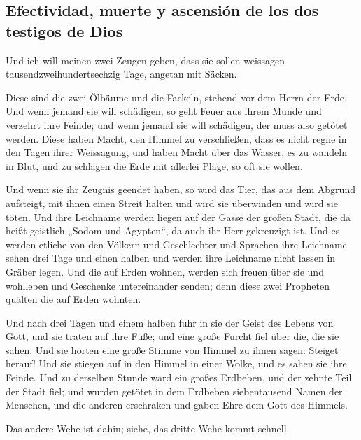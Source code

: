 \hypertarget{efectividad-muerte-y-ascensiuxf3n-de-los-dos-testigos-de-dios}{%
\subsection{Efectividad, muerte y ascensión de los dos testigos de
Dios}\label{efectividad-muerte-y-ascensiuxf3n-de-los-dos-testigos-de-dios}}

 Und ich will meinen zwei Zeugen geben, dass sie sollen
weissagen tausendzweihundertsechzig Tage, angetan mit Säcken.

 Diese sind die zwei Ölbäume und die Fackeln, stehend vor
dem Herrn der Erde.  Und wenn jemand sie will schädigen,
so geht Feuer aus ihrem Munde und verzehrt ihre Feinde; und wenn jemand
sie will schädigen, der muss also getötet werden.  Diese
haben Macht, den Himmel zu verschließen, dass es nicht regne in den
Tagen ihrer Weissagung, und haben Macht über das Wasser, es zu wandeln
in Blut, und zu schlagen die Erde mit allerlei Plage, so oft sie wollen.

 Und wenn sie ihr Zeugnis geendet haben, so wird das Tier,
das aus dem Abgrund aufsteigt, mit ihnen einen Streit halten und wird
sie überwinden und wird sie töten.  Und ihre Leichname
werden liegen auf der Gasse der großen Stadt, die da heißt geistlich
„Sodom und Ägypten``, da auch ihr Herr gekreuzigt ist. 
Und es werden etliche von den Völkern und Geschlechter und Sprachen ihre
Leichname sehen drei Tage und einen halben und werden ihre Leichname
nicht lassen in Gräber legen.  Und die auf Erden wohnen,
werden sich freuen über sie und wohlleben und Geschenke untereinander
senden; denn diese zwei Propheten quälten die auf Erden wohnten.

 Und nach drei Tagen und einem halben fuhr in sie der
Geist des Lebens von Gott, und sie traten auf ihre Füße; und eine große
Furcht fiel über die, die sie sahen.  Und sie hörten eine
große Stimme von Himmel zu ihnen sagen: Steiget herauf! Und sie stiegen
auf in den Himmel in einer Wolke, und es sahen sie ihre Feinde.
 Und zu derselben Stunde ward ein großes Erdbeben, und
der zehnte Teil der Stadt fiel; und wurden getötet in dem Erdbeben
siebentausend Namen der Menschen, und die anderen erschraken und gaben
Ehre dem Gott des Himmels.

 Das andere Wehe ist dahin; siehe, das dritte Wehe kommt
schnell.


